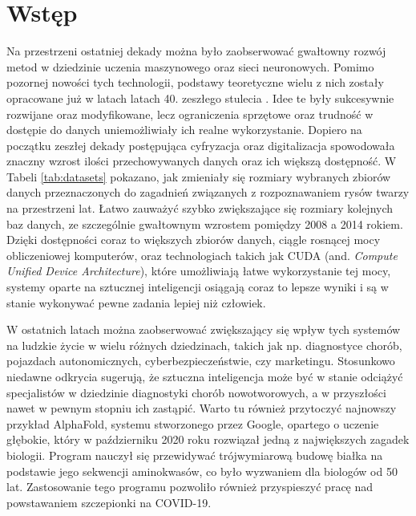 \documentclass[a4paper,twoside,12pt]{book}
\newcommand{\obcy}[1]{\emph{#1}}
\newcommand{\ang}[1]{{\selectlanguage{british}\obcy{#1}}}
\newcounter{stronyPozaNumeracja}
\begin{document}
\vfill

 

\cleardoublepage


\pagestyle{tylkoNumeryStron}
\tableofcontents

\mainmatter
{}
\setcounter{stronyPozaNumeracja}{\value{page}}
\pagestyle{NumeryStronNazwyRozdzialow}


\chapter{Wstęp}
{Na przestrzeni ostatniej dekady można było zaobserwować gwałtowny rozwój metod w dziedzinie uczenia maszynowego oraz sieci neuronowych. Pomimo pozornej nowości tych technologii, podstawy teoretyczne wielu z nich zostały opracowane już w latach latach 40. zeszłego stulecia \cite{bib:neural1}. Idee te były sukcesywnie rozwijane oraz modyfikowane, lecz ograniczenia sprzętowe oraz trudność w dostępie do danych uniemożliwiały ich realne wykorzystanie. Dopiero na początku zeszłej dekady postępująca cyfryzacja oraz digitalizacja spowodowała znaczny wzrost ilości przechowywanych danych oraz ich większą dostępność. W Tabeli \ref{tab:datasets} pokazano, jak zmieniały się rozmiary wybranych zbiorów danych przeznaczonych do zagadnień związanych z rozpoznawaniem rysów twarzy na przestrzeni lat. Łatwo zauważyć szybko zwiększające się rozmiary kolejnych baz danych, ze szczególnie gwałtownym wzrostem pomiędzy 2008 a 2014 rokiem. Dzięki dostępności coraz to większych zbiorów danych, ciągle rosnącej mocy obliczeniowej komputerów, oraz technologiach takich jak CUDA (and. \ang {Compute Unified Device Architecture}), które umożliwiają łatwe wykorzystanie tej mocy, systemy oparte na sztucznej inteligencji osiągają coraz to lepsze wyniki i są w stanie wykonywać pewne zadania lepiej niż człowiek.}

{ W ostatnich latach można zaobserwować zwiększający się wpływ tych systemów na ludzkie życie w wielu różnych dziedzinach, takich jak np. diagnostyce chorób, pojazdach autonomicznych, cyberbezpieczeństwie, czy marketingu. Stosunkowo niedawne odkrycia\cite{bib:cancer,bib:cancer2} sugerują, że sztuczna inteligencja może być w stanie odciążyć specjalistów w dziedzinie  diagnostyki chorób nowotworowych, a w przyszłości nawet w pewnym stopniu ich zastąpić. Warto tu również przytoczyć najnowszy przykład AlphaFold, systemu stworzonego przez Google, opartego o uczenie głębokie, który w październiku 2020 roku rozwiązał jedną z największych zagadek biologii\cite{service2020game}. Program nauczył się przewidywać trójwymiarową budowę białka na podstawie jego sekwencji aminokwasów, co było wyzwaniem dla biologów od 50 lat. Zastosowanie tego programu pozwoliło również przyspieszyć pracę nad powstawaniem szczepionki na COVID-19.}
\end{document}
